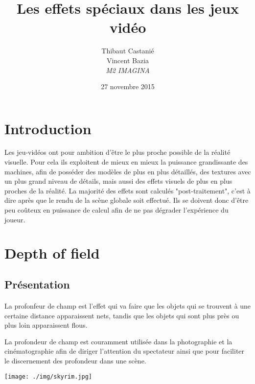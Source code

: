 \documentclass[a4paper]{article}
\title{Les effets spéciaux dans les jeux vidéo}
\author{Thibaut Castanié\\Vincent Bazia\\\textit{M2 IMAGINA}}
\date{27 novembre 2015}
\begin{document}
\maketitle
\vspace{2cm}
\tableofcontents

\thispagestyle{empty}

\newpage
\setcounter{page}{1}
\section*{Introduction}
\label{sec:intro}
\paragraph{} Les jeu-vidéos ont pour ambition d'être le plus proche possible de la réalité visuelle. Pour cela ils exploitent de mieux en mieux la puissance grandissante des machines, afin de posséder des modèles de plus en plus détaillés, des textures avec un plus grand niveau de détails, mais aussi des effets visuels de plus en plus proches de la réalité. La majorité des effets sont calculés "post-traitement", c'est à dire après que le rendu de la scène globale soit effectué. Ils se doivent donc d'être peu coûteux en puissance de calcul afin de ne pas dégrader l'expérience du joueur.



\section{Depth of field}

\subsection{Présentation}
\paragraph{} La profonfeur de champ est l'effet qui va faire que les objets qui se trouvent à une certaine distance apparaissent nets, tandis que les objets qui sont plus près ou plus loin apparaissent flous. 

La profondeur de champ est couramment utilisée dans la photographie et la cinématographie afin de diriger l'attention du spectateur ainsi que pour faciliter le discernement des profondeur dans une scène.
\begin{center}
\texttt{[image: ./img/skyrim.jpg]}
\end{center}
\end{document}
